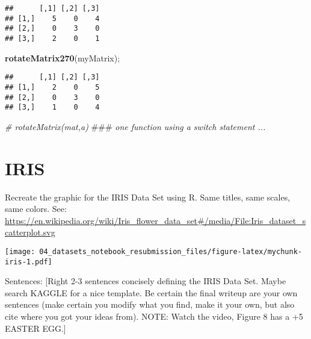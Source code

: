 \documentclass[
]{article}
\newenvironment{Shaded}{\begin{snugshade}}{\end{snugshade}}
\newcommand{\AlertTok}[1]{\textcolor[rgb]{0.94,0.16,0.16}{#1}}
\newcommand{\CommentTok}[1]{\textcolor[rgb]{0.56,0.35,0.01}{\textit{#1}}}
\newcommand{\DataTypeTok}[1]{\textcolor[rgb]{0.13,0.29,0.53}{#1}}
\newcommand{\DecValTok}[1]{\textcolor[rgb]{0.00,0.00,0.81}{#1}}
\newcommand{\KeywordTok}[1]{\textcolor[rgb]{0.13,0.29,0.53}{\textbf{#1}}}
\newcommand{\NormalTok}[1]{#1}
\newcommand{\OperatorTok}[1]{\textcolor[rgb]{0.81,0.36,0.00}{\textbf{#1}}}
\newcommand{\StringTok}[1]{\textcolor[rgb]{0.31,0.60,0.02}{#1}}
\begin{document}
\begin{verbatim}
##      [,1] [,2] [,3]
## [1,]    5    0    4
## [2,]    0    3    0
## [3,]    2    0    1
\end{verbatim}

\begin{Shaded}
\begin{Highlighting}[]
\KeywordTok{rotateMatrix270}\NormalTok{(myMatrix);}
\end{Highlighting}
\end{Shaded}

\begin{verbatim}
##      [,1] [,2] [,3]
## [1,]    2    0    5
## [2,]    0    3    0
## [3,]    1    0    4
\end{verbatim}

\begin{Shaded}
\begin{Highlighting}[]
\CommentTok{# rotateMatrix(mat,a) }\AlertTok{###}\CommentTok{ one function using a switch statement ...}
\end{Highlighting}
\end{Shaded}

\hypertarget{iris}{%
\section{IRIS}\label{iris}}

Recreate the graphic for the IRIS Data Set using R. Same titles, same
scales, same colors. See:
\url{https://en.wikipedia.org/wiki/Iris_flower_data_set#/media/File:Iris_dataset_scatterplot.svg}

\begin{Shaded}
\end{Shaded}

\texttt{[image: 04\_datasets\_notebook\_resubmission\_files/figure-latex/mychunk-iris-1.pdf]}

Sentences: {[}Right 2-3 sentences concisely defining the IRIS Data Set.
Maybe search KAGGLE for a nice template. Be certain the final writeup
are your own sentences (make certain you modify what you find, make it
your own, but also cite where you got your ideas from). NOTE: Watch the
video, Figure 8 has a +5 EASTER EGG.{]}
\end{document}
